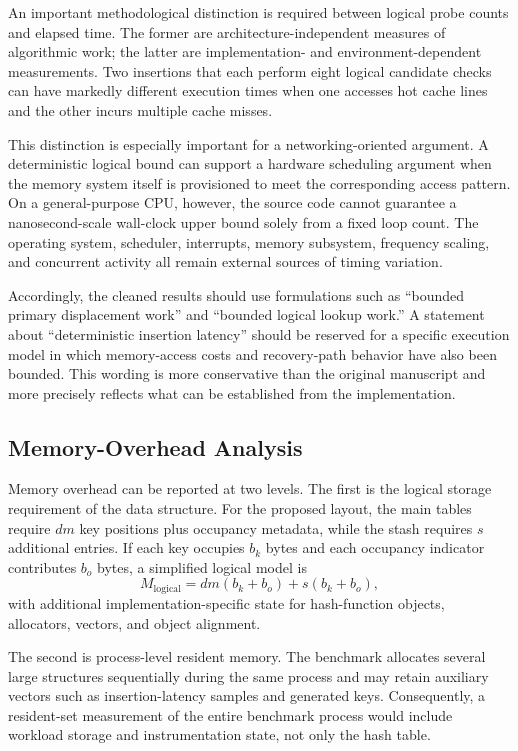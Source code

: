 \documentclass[conference]{IEEEtran}
\begin{document}
An important methodological distinction is required between logical probe counts and elapsed time. The former are architecture-independent measures of algorithmic work; the latter are implementation- and environment-dependent measurements. Two insertions that each perform eight logical candidate checks can have markedly different execution times when one accesses hot cache lines and the other incurs multiple cache misses.

This distinction is especially important for a networking-oriented argument. A deterministic logical bound can support a hardware scheduling argument when the memory system itself is provisioned to meet the corresponding access pattern. On a general-purpose CPU, however, the source code cannot guarantee a nanosecond-scale wall-clock upper bound solely from a fixed loop count. The operating system, scheduler, interrupts, memory subsystem, frequency scaling, and concurrent activity all remain external sources of timing variation.

Accordingly, the cleaned results should use formulations such as ``bounded primary displacement work'' and ``bounded logical lookup work.'' A statement about ``deterministic insertion latency'' should be reserved for a specific execution model in which memory-access costs and recovery-path behavior have also been bounded. This wording is more conservative than the original manuscript and more precisely reflects what can be established from the implementation.

\subsection{Memory-Overhead Analysis}
\label{subsec:memory_results}

Memory overhead can be reported at two levels. The first is the logical storage requirement of the data structure. For the proposed layout, the main tables require $d m$ key positions plus occupancy metadata, while the stash requires $s$ additional entries. If each key occupies $b_k$ bytes and each occupancy indicator contributes $b_o$ bytes, a simplified logical model is
\begin{equation}
M_{\mathrm{logical}}
= d m (b_k+b_o)+s(b_k+b_o),
\end{equation}
with additional implementation-specific state for hash-function objects, allocators, vectors, and object alignment.

The second is process-level resident memory. The benchmark allocates several large structures sequentially during the same process and may retain auxiliary vectors such as insertion-latency samples and generated keys. Consequently, a resident-set measurement of the entire benchmark process would include workload storage and instrumentation state, not only the hash table.
\end{document}
